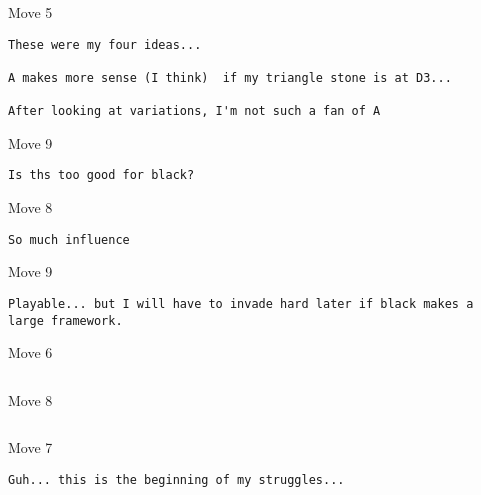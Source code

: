 \documentclass{article}
\begin{document}
\begin{center}
\begin{section}{Move 5}
\cleargoban
{}
\showfullgoban
\begin{verbatim}
These were my four ideas...

A makes more sense (I think)  if my triangle stone is at D3...

After looking at variations, I'm not such a fan of A\end{verbatim}
\end{section}
\begin{section}{Move 9}
\cleargoban
{}
\showfullgoban
\begin{verbatim}
Is ths too good for black?\end{verbatim}
\end{section}
\begin{section}{Move 8}
\cleargoban
{}
\showfullgoban
\begin{verbatim}
So much influence\end{verbatim}
\end{section}
\begin{section}{Move 9}
\cleargoban
{}
\showfullgoban
\begin{verbatim}
Playable... but I will have to invade hard later if black makes a large framework.\end{verbatim}
\end{section}
\begin{section}{Move 6}
\cleargoban
{}
\showfullgoban
\begin{verbatim}
\end{verbatim}
\end{section}
\begin{section}{Move 8}
\cleargoban
{}
\showfullgoban
\begin{verbatim}
\end{verbatim}
\end{section}
\begin{section}{Move 7}
\cleargoban
{}
\showfullgoban
\begin{verbatim}
Guh... this is the beginning of my struggles...\end{verbatim}

\end{section}
\end{center}
\end{document}

